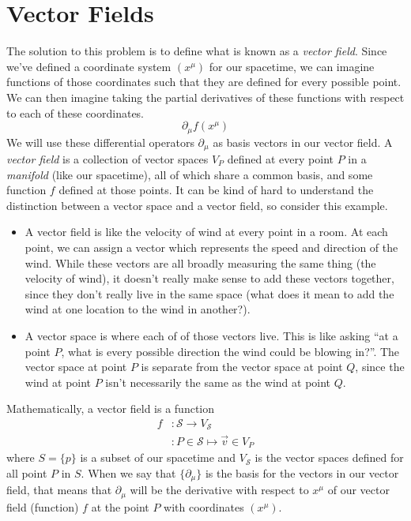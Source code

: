 \section{Vector Fields}
The solution to this problem is to define what is known as a \emph{vector field}.
Since we've defined a coordinate system $(x^\mu)$ for our spacetime, we can imagine functions of those coordinates such that they are defined for every possible point.
We can then imagine taking the partial derivatives of these functions with respect to each of these coordinates.
\[ \partial_\mu f(x^\mu) \tag{defined for every $x^\mu$} \]
We will use these differential operators $\partial_\mu$ as basis vectors in our vector field.
A \emph{vector field} is a collection of vector spaces $V_P$ defined at every point $P$ in a \emph{manifold} (like our spacetime), all of which share a common basis, and some function $f$ defined at those points.
It can be kind of hard to understand the distinction between a vector space and a vector field, so consider this example.
\begin{itemize}
    \item A vector field is like the velocity of wind at every point in a room.
    At each point, we can assign a vector which represents the speed and direction of the wind.
    While these vectors are all broadly measuring the same thing (the velocity of wind), it doesn't really make sense to add these vectors together, since they don't really live in the same space (what does it mean to add the wind at one location to the wind in another?).
    \item A vector space is where each of of those vectors live.
    This is like asking ``at a point $P$, what is every possible direction the wind could be blowing in?''.
    The vector space at point $P$ is separate from the vector space at point $Q$, since the wind at point $P$ isn't necessarily the same as the wind at point $Q$.
\end{itemize}
Mathematically, a vector field is a function
\begin{align*}
    f &: \mathcal{S} \to V_\mathcal{S} \\
      &: P \in \mathcal{S} \mapsto \vec{v} \in V_P
\end{align*}
where $S = \{p\}$ is a subset of our spacetime and $V_\mathcal{S}$ is the vector spaces defined for all point $P$ in $S$.
When we say that $\{\partial_\mu\}$ is the basis for the vectors in our vector field, that means that $\partial_\mu$ will be the derivative with respect to $x^\mu$ of our vector field (function) $f$ at the point $P$ with coordinates $(x^\mu)$.
